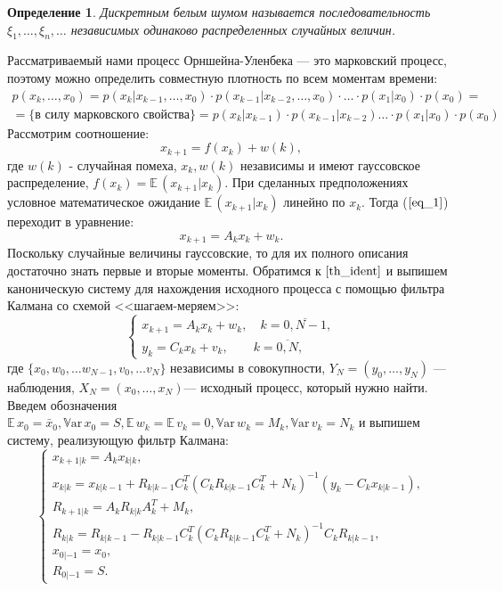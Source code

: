 \documentclass[oneside, final, 12pt]{article}
\def\Var{{\mathbb{V}\textrm{ar}}\,}
\def\E{{\mathbb{E} }\,}
\newtheorem{definition}{Определение}
\begin{document}
	\begin{definition}
		Дискретным белым шумом называется последовательность $\xi_1,\ldots,\xi_n,\ldots$ независимых 
		одинаково распределенных случайных величин.
	\end{definition}
	Рассматриваемый нами процесс Орншейна-Уленбека --- это марковский процесс, 
	поэтому можно определить совместную плотность по всем моментам времени:
	$$
		\begin{gathered}
			p(x_k, \ldots,x_0) = p(x_k|x_{k-1},\ldots,x_0)\cdot  p(x_{k-1}|x_{k-2},\ldots,x_0)\cdot
				 \ldots \cdot  p(x_1|x_0) \cdot p(x_0) = \\
				 = \text{\{в силу марковского свойства\}} =  p(x_k|x_{k-1})\cdot p(x_{k-1}|x_{k-2}) 
				 	\ldots \cdot  p(x_1|x_0) \cdot p(x_0)
		\end{gathered}
	$$
	Рассмотрим соотношение:
	\begin{equation}
		x_{k+1} = f(x_k)+w(k), \label{eq_1}
	\end{equation}
	 где $w(k)$ - случайная помеха, $x_k, w(k)$ независимы и имеют гауссовское распределение, 
	 $f(x_k) = \E (x_{k+1}|x_k)$. 
	 \newline При сделанных предположениях условное математическое ожидание 
	 $\E (x_{k+1}|x_k)$ линейно по $x_k$. Тогда ($\ref{eq_1}$) переходит в уравнение:
	 $$ x_{k+1} = A_k x_k + w_k.$$
	 Поскольку случайные величины гауссовские, то для их полного описания достаточно знать 
	 первые и вторые моменты.
	 Обратимся к $\cite{th_ident}$ и выпишем каноническую систему для нахождения
	 исходного процесса с помощью фильтра Калмана со схемой <<шагаем-меряем>>:
	 \begin{equation}
	 	\begin{cases}
	 		x_{k+1} = A_k x_k + w_k, \quad k = \overline{0,N-1}, \\
	 		y_{k} = C_k x_k + v_k, \qquad k = \overline{0,N}, 
	 	\end{cases} \label{kalm_sys}
	\end{equation}
	где $\{x_0, w_0, \ldots w_{N-1}, v_0, \ldots v_N\}$ независимы в совокупности, 
	$Y_{N}= (y_0, \ldots, y_{N}) $ --- наблюдения, $X_{N}= (x_0, \ldots, x_{N}) $--- исходный процесс, 
	который нужно найти.
	\newpage
	Введем обозначения $\E x_0 = \bar{x}_0, \Var x_0= S, 
	\E w_k = \E v_k = 0, \Var w_k = M_k, \Var v_k= N_k$ и выпишем систему, реализующую 
	фильтр Калмана: 
	\begin{equation}
		\begin{cases}
			x_{k+1|k} = A_k x_{k|k}, \\
			x_{k|k}  = x_{k|k-1} + R_{k|k-1} C_k^T(C_k R_{k|k-1}C_k^T + N_k)^{-1}(y_k - C_k x_{k|k-1}), \\
			R_{k+1|k} = A_k R_{k|k} A_k^T + M_k,\\
			R_{k|k} = R_{k|k-1} - R_{k|k-1} C_k^T(C_k R_{k|k-1}C_k^T + N_k)^{-1}C_k R_{k|k-1}, \\
			x_{0|-1} = x_0,\\ 
			R_{0|-1} = S.
		\end{cases} \label{kalm}
	\end{equation}
\end{document}
